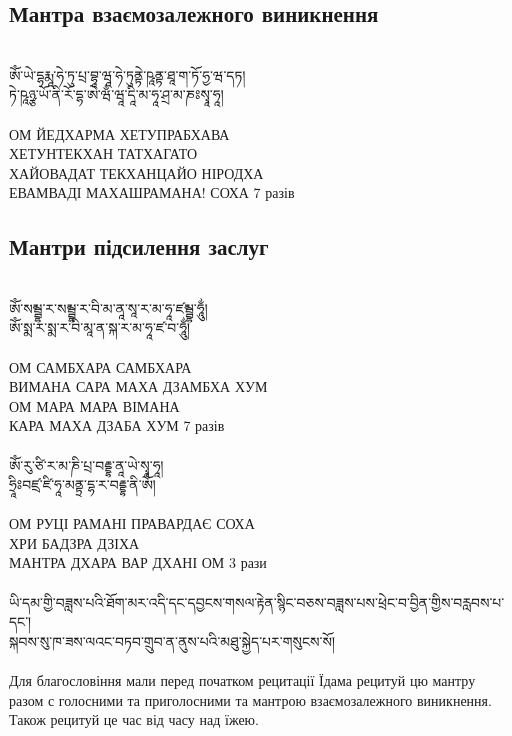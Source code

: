 \subsection*{Мантра взаємозалежного виникнення}
\\
\ti
ཨོཾ་ཡེ་དྷརྨཱ་ཧེ་ཏུ་པྲ་བྷཱ་ཝཱ་ཧེ་ཏུནྟེ་ཥཱནྟ་ཐཱ་ག་ཏོ་ཧྱ་ཝ་དཏ།\\
 ཏེ་ཥཱཉྩ་ཡོ་ནི་རོ་དྷ་ཨེ་ཝྃ་ཝཱ་དཱི་མ་ཧཱ་ཤྲ་མ་ཎཿསྭཱ་ཧཱ།\\
 \\
\ru
ОМ ЙЕДХАРМА ХЕТУПРАБХАВА\\
ХЕТУНТЕКХАН ТАТХАГАТО\\
ХАЙОВАДАТ ТЕКХАНЦАЙО НІРОДХА\\
ЕВАМВАДІ МАХАШРАМАНА! СОХА \hspace{1cm} 7 разів\\

\subsection*{Мантри підсилення заслуг}
\\
\ti
ཨོཾ་སམྦྷ་ར་སམྦྷ་ར་བི་མ་ནཱ་སཱ་ར་མ་ཧཱ་ཛམྦྷ་ཧཱུྂ།\\
ཨོཾ་སྨ་ར་སྨ་ར་བི་མཱ་ན་སྐ་ར་མ་ཧཱ་ཛ་བ་ཧཱུྂ།\\
\\
\ru
ОМ САМБХАРА САМБХАРА\\
ВИМАНА САРА МАХА ДЗАМБХА ХУМ\\
ОМ МАРА МАРА ВІМАНА\\
КАРА МАХА ДЗАБА ХУМ \hspace{1cm} 7 разів\\
\\
\ti
ཨོཾ་རུ་ཙི་ར་མ་ཎི་པྲ་བརྡྷ་ནཱ་ཡེ་སྭཱ་ཧཱ།\\
ཧྲཱིཿབཛྲ་ཛི་ཧཱ་མནྟྲ་དྷ་ར་བརྡྷ་ནི་ཨོཾ།\\
\\
\ru
ОМ РУЦІ РАМАНІ ПРАВАРДАЄ СОХА\\
ХРИ БАДЗРА ДЗІХА\\
МАНТРА ДХАРА ВАР ДХАНІ ОМ \hspace{1cm} 3 рази\\
\\
\scriptsize
\ti ཡི་དམ་གྱི་བཟླས་པའི་ཐོག་མར་འདི་དང་དབྱངས་གསལ་རྟེན་སྙིང་བཅས་བཟླས་པས་ཕྲེང་བ་བྱིན་གྱིས་བརླབས་པ་དང་།\\
སྐབས་སུ་ཁ་ཟས་ལའང་བཏབ་གྲུབ་ན་ནུས་པའི་མཐུ་སྐྱེད་པར་གསུངས་སོ།\\
\\
\ru Для благословіння мали перед початком рецитації Їдама
рецитуй цю мантру разом с голосними та приголосними
та мантрою взаємозалежного виникнення.
Також рецитуй це час від часу над їжею.
\normalsize
